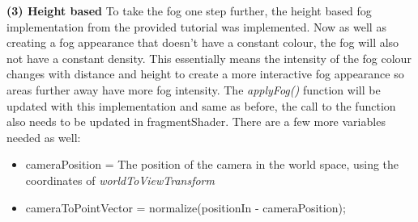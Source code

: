 \documentclass[a4 paper, 12pt]{article}
\begin{document}
\textbf{(3) Height based}
To take the fog one step further, the height based fog implementation from the provided tutorial was implemented. Now as well as creating a fog appearance that doesn't have a constant colour, the fog will also not have a constant density. This essentially means the intensity of the fog colour changes with distance and height to create a more interactive fog appearance so areas further away have more fog intensity. The \textit{applyFog()} function will be updated with this implementation and same as before, the call to the function also needs to be updated in fragmentShader. There are a few more variables needed as well:
    \begin{itemize}
        \item cameraPosition = The position of the camera in the world space, using the coordinates of \textit{worldToViewTransform} 
        \item cameraToPointVector = normalize(positionIn - cameraPosition);
    \end{itemize}
\end{document}
